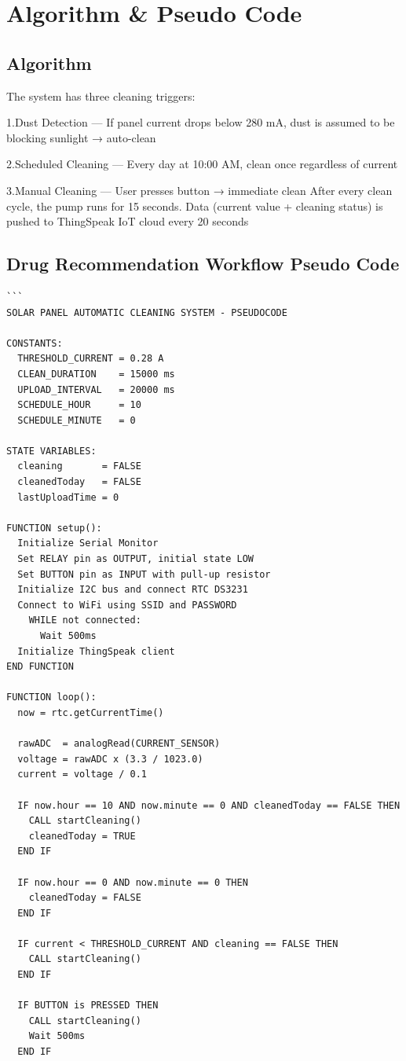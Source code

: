 \documentclass[10pt]{report}
\begin{document}
\begin{sloppypar}
{{{\begin{sloppypar}
\section{Algorithm \& Pseudo Code}
\subsection{Algorithm}
The system has three cleaning triggers:
\item1.Dust Detection — If panel current drops below 280 mA, dust is assumed to be
blocking sunlight → auto-clean
\item2.Scheduled Cleaning — Every day at 10:00 AM, clean once regardless of current
\item3.Manual Cleaning — User presses button → immediate clean
After every clean cycle, the pump runs for 15 seconds. Data (current value +
cleaning status) is pushed to ThingSpeak IoT cloud every 20 seconds

\subsection{Drug Recommendation Workflow Pseudo Code}

\begin{verbatim}
```
SOLAR PANEL AUTOMATIC CLEANING SYSTEM - PSEUDOCODE

CONSTANTS:
  THRESHOLD_CURRENT = 0.28 A
  CLEAN_DURATION    = 15000 ms
  UPLOAD_INTERVAL   = 20000 ms
  SCHEDULE_HOUR     = 10
  SCHEDULE_MINUTE   = 0

STATE VARIABLES:
  cleaning       = FALSE
  cleanedToday   = FALSE
  lastUploadTime = 0

FUNCTION setup():
  Initialize Serial Monitor
  Set RELAY pin as OUTPUT, initial state LOW
  Set BUTTON pin as INPUT with pull-up resistor
  Initialize I2C bus and connect RTC DS3231
  Connect to WiFi using SSID and PASSWORD
    WHILE not connected:
      Wait 500ms
  Initialize ThingSpeak client
END FUNCTION

FUNCTION loop():
  now = rtc.getCurrentTime()

  rawADC  = analogRead(CURRENT_SENSOR)
  voltage = rawADC x (3.3 / 1023.0)
  current = voltage / 0.1

  IF now.hour == 10 AND now.minute == 0 AND cleanedToday == FALSE THEN
    CALL startCleaning()
    cleanedToday = TRUE
  END IF

  IF now.hour == 0 AND now.minute == 0 THEN
    cleanedToday = FALSE
  END IF

  IF current < THRESHOLD_CURRENT AND cleaning == FALSE THEN
    CALL startCleaning()
  END IF

  IF BUTTON is PRESSED THEN
    CALL startCleaning()
    Wait 500ms
  END IF


\end{verbatim}
\end{sloppypar}}}}
\end{sloppypar}
\end{document}
